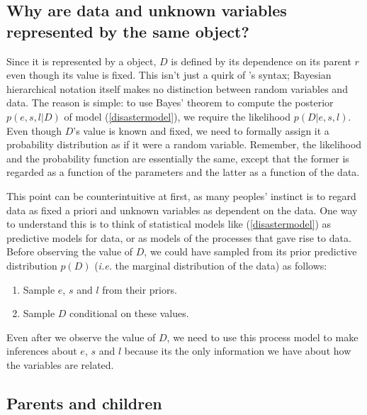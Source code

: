 \documentclass[]{jss}
\begin{document}
\subsection{Why are data and unknown variables represented by the same
object?}
Since it is represented by a  object, $D$ is defined by its dependence on its parent $r$ even though its value is fixed. This isn't just a quirk of 's syntax; Bayesian hierarchical notation itself makes no distinction between random variables and data. The reason is simple: to use Bayes' theorem to compute the posterior $p(e,s,l|D)$ of model (\ref{disastermodel}), we require the likelihood $p(D|e,s,l)$. Even though $D$'s value is known and fixed, we need to formally assign it a probability distribution as if it were a random variable. Remember, the likelihood and the probability function are essentially the same, except that the former is regarded as a function of the parameters and the latter as a function of the data.

This point can be counterintuitive at first, as many peoples' instinct is to regard data as fixed a priori and unknown variables as dependent on the data. One way to understand this is to think of statistical models like (\ref{disastermodel}) as predictive models for data, or as models of the processes that gave rise to data. Before observing the value of $D$, we could have sampled from its prior predictive distribution $p(D)$ (\emph{i.e.} the marginal distribution of the data) as follows:
\begin{enumerate}
    \item Sample $e$, $s$ and $l$ from their priors.
    \item Sample $D$ conditional on these values.
\end{enumerate}
Even after we observe the value of $D$, we need to use this process model to make inferences about $e$, $s$ and $l$ because its the only information we have about how the variables are related.

\subsection{Parents and children}
\end{document}
